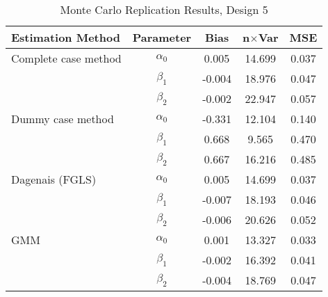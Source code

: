 \begin{table}
\centering
\caption{Monte Carlo Replication Results, Design 5}
\label{table:MCReplicationResultsDesign5}
\begin{tabular}{lcccc}
\toprule
Estimation Method & Parameter & Bias & n$\times$Var & MSE \\
\midrule
Complete case method & $\alpha_0$ & 0.005 & 14.699 & 0.037 \\
 & $\beta_1$ & -0.004 & 18.976 & 0.047 \\
 & $\beta_2$ & -0.002 & 22.947 & 0.057 \\
Dummy case method & $\alpha_0$ & -0.331 & 12.104 & 0.140 \\
 & $\beta_1$ & 0.668 & 9.565 & 0.470 \\
 & $\beta_2$ & 0.667 & 16.216 & 0.485 \\
Dagenais (FGLS) & $\alpha_0$ & 0.005 & 14.699 & 0.037 \\
 & $\beta_1$ & -0.007 & 18.193 & 0.046 \\
 & $\beta_2$ & -0.006 & 20.626 & 0.052 \\
GMM & $\alpha_0$ & 0.001 & 13.327 & 0.033 \\
 & $\beta_1$ & -0.002 & 16.392 & 0.041 \\
 & $\beta_2$ & -0.004 & 18.769 & 0.047 \\
\bottomrule
\end{tabular}
\end{table}
